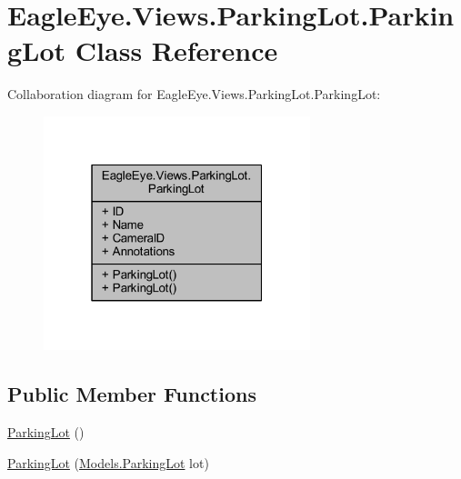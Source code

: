 \hypertarget{class_eagle_eye_1_1_views_1_1_parking_lot_1_1_parking_lot}{}\section{Eagle\+Eye.\+Views.\+Parking\+Lot.\+Parking\+Lot Class Reference}
\label{class_eagle_eye_1_1_views_1_1_parking_lot_1_1_parking_lot}


Collaboration diagram for Eagle\+Eye.\+Views.\+Parking\+Lot.\+Parking\+Lot\+:\nopagebreak
\begin{figure}[H]
\begin{center}
\leavevmode
\includegraphics[width=220pt]{class_eagle_eye_1_1_views_1_1_parking_lot_1_1_parking_lot__coll__graph}
\end{center}
\end{figure}
\subsection*{Public Member Functions}
\begin{DoxyCompactItemize}
\item 
\mbox{\hyperlink{class_eagle_eye_1_1_views_1_1_parking_lot_1_1_parking_lot_ab1048c32ed1b8cfa5e06f8cd9f614e03}{Parking\+Lot}} ()
\item 
\mbox{\hyperlink{class_eagle_eye_1_1_views_1_1_parking_lot_1_1_parking_lot_a59da91cf482ad49cc2ff6ac1ea051f7f}{Parking\+Lot}} (\mbox{\hyperlink{class_eagle_eye_1_1_models_1_1_parking_lot}{Models.\+Parking\+Lot}} lot)
\end{DoxyCompactItemize}
